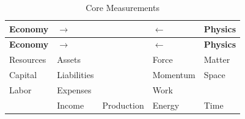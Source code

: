 \documentclass[
  letterpaper,
  DIV=11,
  numbers=noendperiod]{scrartcl}
\begin{document}
\begin{longtable}[]{@{}
  >{\raggedright\arraybackslash}p{}
  >{\raggedright\arraybackslash}p{}
  >{\centering\arraybackslash}p{}
  >{\raggedleft\arraybackslash}p{}
  >{\raggedleft\arraybackslash}p{}@{}}
\caption{Core Measurements}\label{tbl-coremeasuremnts}\tabularnewline
\toprule\noalign{}
\begin{minipage}[b]{\linewidth}\raggedright
\textbf{Economy}
\end{minipage} & \begin{minipage}[b]{\linewidth}\raggedright
\(\rightarrow\)
\end{minipage} & \begin{minipage}[b]{\linewidth}\centering
\end{minipage} & \begin{minipage}[b]{\linewidth}\raggedleft
\(\leftarrow\)
\end{minipage} & \begin{minipage}[b]{\linewidth}\raggedleft
\textbf{Physics}
\end{minipage} \\
\midrule\noalign{}
\endfirsthead
\toprule\noalign{}
\begin{minipage}[b]{\linewidth}\raggedright
\textbf{Economy}
\end{minipage} & \begin{minipage}[b]{\linewidth}\raggedright
\(\rightarrow\)
\end{minipage} & \begin{minipage}[b]{\linewidth}\centering
\end{minipage} & \begin{minipage}[b]{\linewidth}\raggedleft
\(\leftarrow\)
\end{minipage} & \begin{minipage}[b]{\linewidth}\raggedleft
\textbf{Physics}
\end{minipage} \\
\midrule\noalign{}
\endhead
\bottomrule\noalign{}
\endlastfoot
Resources & Assets & & Force & Matter \\
Capital & Liabilities & & Momentum & Space \\
Labor & Expenses & & Work & \\
& Income & Production & Energy & Time \\
\end{longtable}
\end{document}
